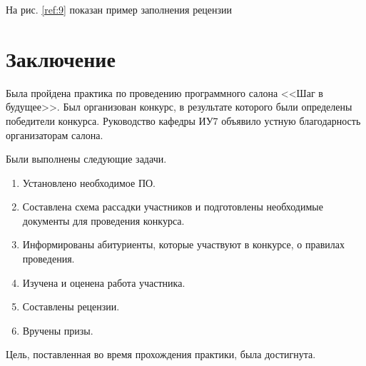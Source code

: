 \documentclass[12pt]{report}
\begin{document}
На рис. \ref{ref:9} показан пример заполнения рецензии

\begin{figure}[ht!]	
\end{figure} 

\chapter{Заключение}

Была пройдена практика по проведению программного салона <<Шаг в будущее>>.
Был организован конкурс, в результате которого были определены победители конкурса.
Руководство кафедры ИУ7 объявило устную благодарность организаторам салона.

Были выполнены следующие задачи.

\begin{enumerate}
	\item Установлено необходимое ПО.
	\item Составлена схема рассадки участников и подготовлены необходимые документы для проведения конкурса.
	\item Информированы абитуриенты, которые участвуют в конкурсе, о правилах проведения. 
	\item Изучена и оценена работа участника.
	\item Составлены рецензии.
	\item Вручены призы.
\end{enumerate}


Цель, поставленная во время прохождения практики, была достигнута. 
\end{document}
